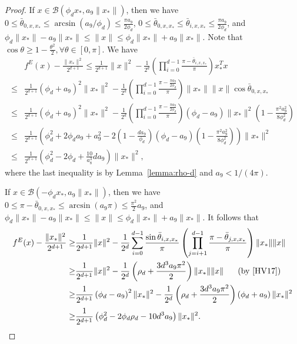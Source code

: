\begin{proof}
If $x \in \mathcal{B}(\phi_d x_*, a_9 \|x_*\|)$, then we have
$0 \leq \bar{\theta}_{0, x, x_*} \leq \arcsin(a_9 / \phi_d) \leq \frac{\pi a_9}{2 \phi_d}$,
$0 \leq \bar{\theta}_{0, x, x_*} \leq \bar{\theta}_{i, x, x_*} \leq \frac{\pi a_9}{2 \phi_d}$, and
$\phi_d \|x_*\| - a_9 \|x_*\| \leq \|x\| \leq \phi_d \|x_*\| + a_9 \|x_*\|$.
Note that $\cos \theta \geq 1 - \frac{\theta^2}{2}, \forall \theta \in [0, \pi]$.
We have
\begin{align*}
&{f^E}(x) - \frac{\|x_*\|^2}{2^{d+1}} \leq \frac{1}{2^{d+1}} \|x\|^2 - \frac{1}{2^d} \left( \prod_{i = 0}^{d - 1} \frac{\pi - \bar{\theta}_{i, x, x_*}}{\pi} \right) x_*^T x \\
\leq& \frac{1}{2^{d+1}} (\phi_d + a_9)^2 \|x_*\|^2 - \frac{1}{2^d} \left( \prod_{i = 0}^{d - 1} \frac{\pi - \frac{\pi a_9}{2 \phi_d}}{\pi} \right) \|x_*\| \|x\| \cos \bar{\theta}_{0, x, x_*} \\
\leq& \frac{1}{2^{d+1}} (\phi_d + a_9)^2 \|x_*\|^2 - \frac{1}{2^d} \left( \prod_{i = 0}^{d - 1} \frac{\pi - \frac{\pi a_9}{2 \phi_d}}{\pi} \right) (\phi_d - a_9) \|x_*\|^2 \left( 1 - \frac{\pi^2 a_9^2}{8 \phi_d^2} \right)\\
\leq& \frac{1}{2^{d+1}} \left( \phi_d^2 + 2 \phi_d a_9 + a_9^2 - 2 \left(1 - \frac{d a_9}{\phi_d}\right) (\phi_d -a_9) \left(1 - \frac{\pi^2 a_9^2}{8 \phi_d^2}\right) \right) \|x_*\|^2 \\
\leq& \frac{1}{2^{d+1}} \left( \phi_d^2 - 2 \phi_d + \frac{10}{a_8^3} d a_9 \right) \|x_*\|^2,
\end{align*}
where the last inequality is by Lemma~\ref{lemma:rho-d} and $a_9 < 1 / (4 \pi)$.

If $x \in \mathcal{B}(- \phi_d x_*, a_9 \|x_*\|)$, then we have
$0 \leq \pi - \bar\theta_{0, x, x_*} \leq \arcsin(a_9 \pi) \leq \frac{\pi^2}{2} a_9$, and
$\phi_d \|x_*\| - a_9 \|x_*\| \leq \|x\| \leq \phi_d \|x_*\| + a_9 \|x_*\|$.
It follows that
\begin{align*}
{f^E}(x) - \frac{\|x_*\|^2}{2^{d+1}} \geq& \frac{1}{2^{d+1}} \|x\|^2 - \frac{1}{2^d} \sum_{i = 0}^{d - 1} \frac{\sin \bar{\theta}_{i, x, x_*}}{\pi} \left( \prod_{j = i + 1}^{d-1} \frac{\pi - \bar{\theta}_{j, x, x_*}}{\pi} \right) \|x_*\|\|x\| \\
\geq& \frac{1}{2^{d+1}} \|x\|^2 - \frac{1}{2^d} \left( \rho_d + \frac{3 d^3a_9 \pi^2}{2} \right) \|x_*\|\|x\| \;\;\;\;\; \hbox{ (by~\cite[(41)]{HV17})} \\
\geq& \frac{1}{2^{d+1}} \left( \phi_d - a_9 \right)^2 \|x_*\|^2 - \frac{1}{2^d} \left( \rho_d + \frac{3 d^3a_9 \pi^2}{2} \right) \left(\phi_d + a_9\right)\|x_*\|^2 \\
\geq& \frac{1}{2^{d+1}} \left(\phi_d^2 - 2 \phi_d \rho_d - 10 d^3 a_9 \right) \|x_*\|^2.
\end{align*}
\end{proof}


